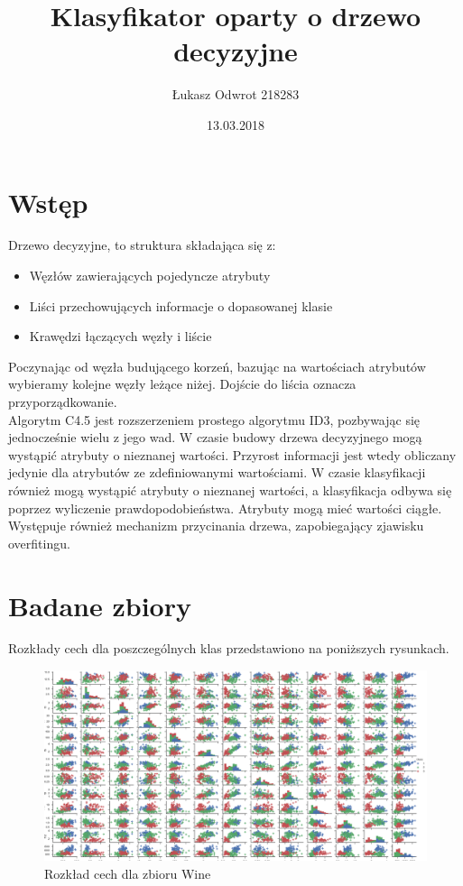 \documentclass[12pt,a4paper]{article}
\title{Klasyfikator oparty o drzewo decyzyjne}
\date{13.03.2018}
\author{Łukasz Odwrot 218283}
\begin{document}
\maketitle
\thispagestyle{empty}
\newpage
\tableofcontents
\setcounter{page}{1}
\newpage

\section{Wstęp}
Drzewo decyzyjne, to struktura składająca się z:
\begin{itemize}
  \item Węzłów zawierających pojedyncze atrybuty
  \item Liści przechowujących informacje o dopasowanej klasie
  \item Krawędzi łączących węzły i liście
\end{itemize}
Poczynając od węzła budującego korzeń, bazując na wartościach atrybutów wybieramy kolejne węzły leżące niżej. Dojście do liścia oznacza przyporządkowanie.\\
Algorytm C4.5 jest rozszerzeniem prostego algorytmu ID3, pozbywając się jednocześnie wielu z jego wad. W czasie budowy drzewa decyzyjnego mogą wystąpić atrybuty o nieznanej wartości. Przyrost informacji jest wtedy obliczany jedynie dla atrybutów ze zdefiniowanymi wartościami. W czasie klasyfikacji również mogą wystąpić atrybuty o nieznanej wartości, a klasyfikacja odbywa się poprzez wyliczenie prawdopodobieństwa. Atrybuty mogą mieć wartości ciągłe. Występuje również mechanizm przycinania drzewa,  zapobiegający zjawisku overfitingu.
\section{Badane zbiory}

Rozkłady cech dla poszczególnych klas przedstawiono na poniższych rysunkach.

\begin{figure}[H]
\centering
\includegraphics[width=1\textwidth]{dsWineCombined.png}
\caption{Rozkład cech dla zbioru Wine}
\end{figure}
\end{document}
